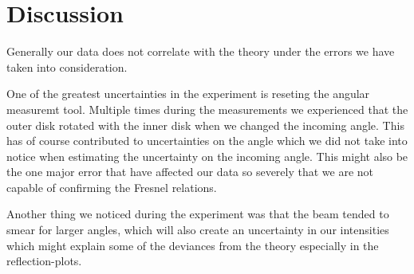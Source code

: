 \section{Discussion}
Generally our data does not correlate with the theory under the errors we have taken into consideration. 


One of the greatest uncertainties in the experiment is reseting the angular measuremt tool. Multiple times during the measurements we experienced that the outer disk rotated with the inner disk when we changed the incoming angle. This has of course contributed to uncertainties on the angle which we did not take into notice when estimating the uncertainty on the incoming angle. This might also be the one major error that have affected our data so severely that we are not capable of confirming the Fresnel relations.

Another thing we noticed during the experiment was that the beam tended to smear for larger angles, which will also create an uncertainty in our intensities which might explain some of the deviances from the theory especially in the reflection-plots. 
